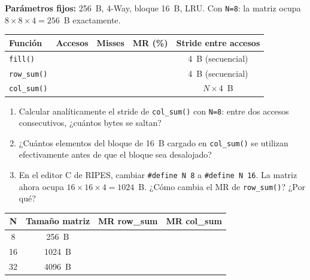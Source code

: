 \documentclass[12pt, a4paper]{article}
\begin{document}
\begin{ejercicio}
    \textbf{Parámetros fijos:} 256~B, 4-Way, bloque 16~B, LRU.
    Con \texttt{N=8}: la matriz ocupa $8\times 8\times 4=256$~B exactamente.

    \begin{center}
    \renewcommand{\arraystretch}{1.8}
    \begin{tabular}{|l|c|c|c|c|}
        \hline
        \textbf{Función} & \textbf{Accesos} & \textbf{Misses} & \textbf{MR (\%)} & \textbf{Stride entre accesos} \\
        \hline
        \texttt{fill()}     & & & & 4~B (secuencial) \\
        \hline
        \texttt{row\_sum()} & & & & 4~B (secuencial) \\
        \hline
        \texttt{col\_sum()} & & & & $N\times 4$~B \\
        \hline
    \end{tabular}
    \end{center}

    \begin{enumerate}
        \item Calcular analíticamente el stride de \texttt{col\_sum()} con \texttt{N=8}:
              entre dos accesos consecutivos, ¿cuántos bytes se saltan?
        \item ¿Cuántos elementos del bloque de 16~B cargado en \texttt{col\_sum()}
              se utilizan efectivamente antes de que el bloque sea desalojado?
        \item En el editor C de RIPES, cambiar \texttt{\#define N 8} a
              \texttt{\#define N 16}. La matriz ahora ocupa $16\times16\times4=1024$~B.
              ¿Cómo cambia el MR de \texttt{row\_sum()}? ¿Por qué?
    \end{enumerate}

    \vspace{0.3cm}
    \begin{center}
    \renewcommand{\arraystretch}{1.8}
    \begin{tabular}{|c|c|c|c|}
        \hline
        \textbf{N} & \textbf{Tamaño matriz} & \textbf{MR row\_sum} & \textbf{MR col\_sum} \\
        \hline
        8  & 256~B  & & \\
        \hline
        16 & 1024~B & & \\
        \hline
        32 & 4096~B & & \\
        \hline
    \end{tabular}
    \end{center}
\end{ejercicio}
\end{document}
